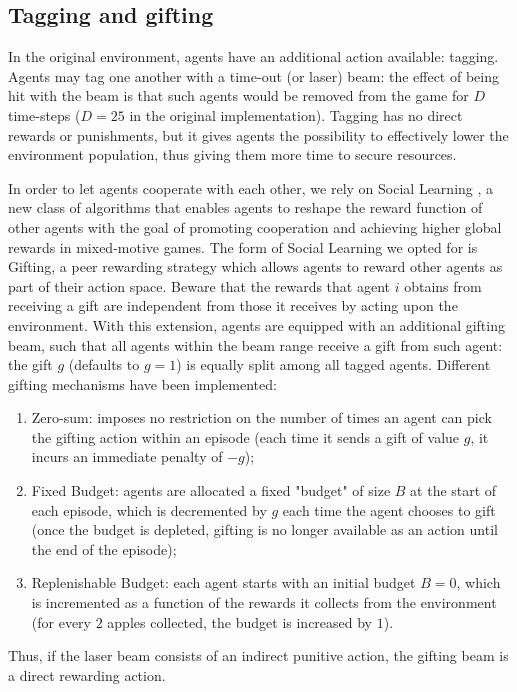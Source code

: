 \documentclass{article}
\begin{document}
\subsection{Tagging and gifting}
In the original environment, agents have an additional action available: tagging. Agents may tag one another with a time-out (or laser) beam: the effect of being hit with the beam is that such agents would be removed from the game for $D$ time-steps ($D=25$ in the original implementation). Tagging has no direct rewards or punishments, but it gives agents the possibility to effectively lower the environment population, thus giving them more time to secure resources.

In order to let agents cooperate with each other, we rely on Social Learning \cite{social-learning}, a new class of algorithms that enables agents to reshape the reward function of other agents with the goal of promoting cooperation and achieving higher global rewards in mixed-motive games. The form of Social Learning we opted for is Gifting, a peer rewarding strategy which allows agents to reward other agents as part of their action space. Beware that the rewards that agent $i$ obtains from receiving a gift are independent from those it receives by acting upon the environment. With this extension, agents are equipped with an additional gifting beam, such that all agents within the beam range receive a gift from such agent: the gift $g$ (defaults to $g=1$) is equally split among all tagged agents. Different gifting mechanisms have been implemented:
\begin{enumerate}
  \item Zero-sum: imposes no restriction on the number of times an agent can pick the gifting action within an episode (each time it sends a gift of value $g$, it incurs an immediate penalty of $-g$);
  \item Fixed Budget: agents are allocated a fixed "budget" of size $B$ at the start of each episode, which is decremented by $g$ each time the agent chooses to gift (once the budget is depleted, gifting is no longer available as an action until the end of the episode);
  \item Replenishable Budget: each agent starts with an initial budget $B = 0$, which is incremented as a function of the rewards it collects from the environment (for every $2$ apples collected, the budget is increased by $1$).
\end{enumerate}

Thus, if the laser beam consists of an indirect punitive action, the gifting beam is a direct rewarding action.
\end{document}
